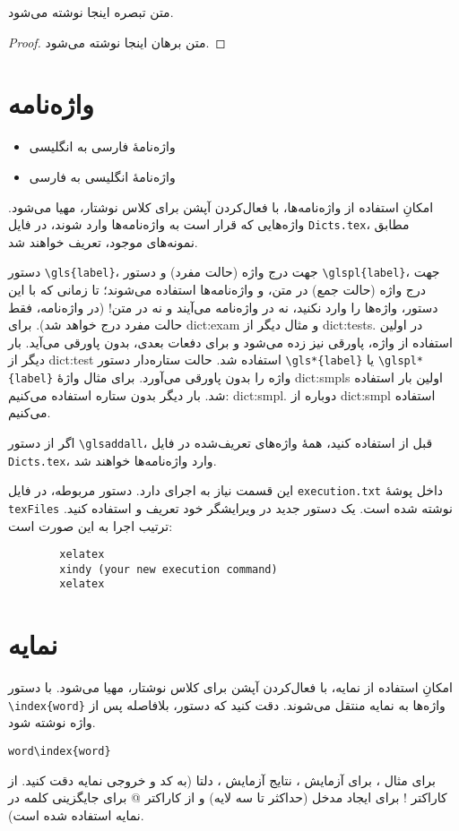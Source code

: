 \begin{rem}
متن تبصره اینجا نوشته می‌شود.
\end{rem}

\begin{proof}
متن برهان اینجا نوشته می‌شود.
\end{proof}

\ifznuUseDicts
\section{واژه‌نامه}
\begin{itemize}
	\item
	واژه‌نامهٔ فارسی به انگلیسی
	\item
	واژه‌نامهٔ انگلیسی به فارسی
\end{itemize}

امکانِ استفاده از واژه‌نامه‌ها، با فعال‌کردن آپشن
برای کلاس نوشتار، مهیا می‌شود. واژه‌هایی که قرار است به واژه‌نامه‌ها وارد شوند،
در فایل
\verb|Dicts.tex|،
مطابق نمونه‌های موجود، تعریف خواهند شد.

دستور
\verb|\gls{label}|،
جهت درج واژه (حالت مفرد) و دستور
\verb|\glspl{label}|،
جهت درج واژه (حالت جمع) در متن، و واژه‌نامه‌ها استفاده می‌شوند؛ تا زمانی که با این دستور، واژه‌ها را وارد نکنید،
نه در واژه‌نامه می‌آیند و نه در متن! (در واژه‌نامه، فقط حالت مفرد درج خواهد شد). برای
\gls{dict:exam}
و مثال دیگر از
\glspl{dict:test}.
در اولین استفاده از واژه، پاورقی نیز زده می‌شود و برای دفعات بعدی، بدون پاورقی می‌آید. بار دیگر از
\gls{dict:test}
استفاده شد.
حالت ستاره‌دار دستور
\verb|\gls*{label}|
یا
\verb|\glspl*{label}|
واژه را بدون پاورقی می‌آورد. برای مثال واژهٔ
\glspl*{dict:smpl}
اولین بار استفاده شد. بار دیگر بدون ستاره استفاده می‌کنیم:
\gls{dict:smpl}.
دوباره از
\gls{dict:smpl}
استفاده می‌کنیم.

اگر از دستور
\verb|\glsaddall|،
قبل از
\verb||
استفاده کنید، همهٔ واژه‌های تعریف‌شده در فایل
\verb|Dicts.tex|،
وارد واژه‌نامه‌ها خواهند شد.

این قسمت نیاز به اجرای
دارد. دستور مربوطه، در فایل
\verb|execution.txt|
داخل پوشهٔ
\verb|texFiles|
نوشته شده است. یک دستور جدید در ویرایشگر خود تعریف و استفاده کنید. ترتیب اجرا به این صورت است:
\begin{latin}
	\begin{verbatim}
		xelatex
		xindy (your new execution command)
		xelatex
	\end{verbatim}
\end{latin}
\fi

\ifznuUseIndex
\section{نمایه}
امکانِ استفاده از نمایه، با فعال‌کردن آپشن
برای کلاس نوشتار، مهیا می‌شود. با دستور
\verb|\index{word}|
 واژه‌ها به نمایه منتقل می‌شوند. دقت کنید که دستور، بلافاصله پس از واژه نوشته شود.
 \begin{latin}\noindent
 	\verb|word\index{word}|
 \end{latin}
برای مثال%
،
برای آزمایش%
،
نتایج آزمایش%
،
دلتا%
(به کد و خروجی نمایه دقت کنید. از کاراکتر ! برای ایجاد مدخل (حداکثر تا سه لایه) و از
کاراکتر @ برای جایگزینی کلمه در نمایه استفاده شده است).

